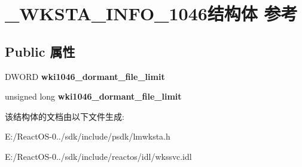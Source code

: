 \hypertarget{struct___w_k_s_t_a___i_n_f_o__1046}{}\section{\+\_\+\+W\+K\+S\+T\+A\+\_\+\+I\+N\+F\+O\+\_\+1046结构体 参考}
\label{struct___w_k_s_t_a___i_n_f_o__1046}
\subsection*{Public 属性}
\begin{DoxyCompactItemize}
\item 
\mbox{\label{struct___w_k_s_t_a___i_n_f_o__1046_aeabe9d5484682373f8fc288d51a1cc77}} 
D\+W\+O\+RD {\bfseries wki1046\+\_\+dormant\+\_\+file\+\_\+limit}
\item 
\mbox{\label{struct___w_k_s_t_a___i_n_f_o__1046_abfe221093879b4967dfca64c76cdb9df}} 
unsigned long {\bfseries wki1046\+\_\+dormant\+\_\+file\+\_\+limit}
\end{DoxyCompactItemize}


该结构体的文档由以下文件生成\+:\begin{DoxyCompactItemize}
\item 
E\+:/\+React\+O\+S-\/0../sdk/include/psdk/lmwksta.\+h\item 
E\+:/\+React\+O\+S-\/0../sdk/include/reactos/idl/wkssvc.\+idl\end{DoxyCompactItemize}
